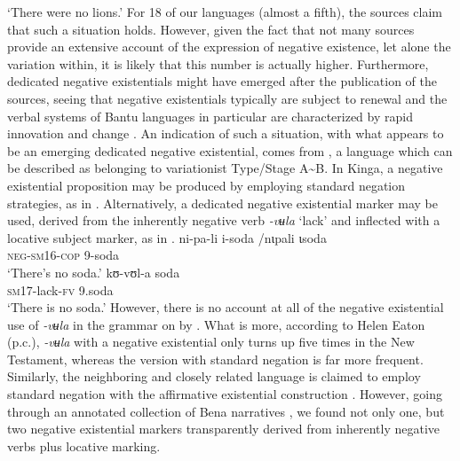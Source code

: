 \documentclass[output=paper]{langscibook}
\begin{document}
`There were no lions.' \z\z 
%
For 18
of our languages (almost a fifth), the sources claim that such a situation
holds. However, given the fact that not many sources provide an extensive
account of the expression of negative existence, let alone the variation
within, it is likely that this number is actually higher. Furthermore,
dedicated negative existentials might have emerged after the publication of
the sources, seeing that negative existentials typically are subject to
renewal \citep{Veselinova2016} and the verbal systems of Bantu languages in particular are
characterized by rapid innovation and change \citep[25]{Nurse2008}. An
indication of such a situation, with what appears to be an emerging
dedicated negative existential, comes from , a language which
can be described as belonging to variationist Type\slash Stage
A{\textasciitilde}B. In Kinga, a negative existential proposition may be
produced by employing standard negation strategies, as in
. Alternatively, a dedicated negative existential
marker may be used, derived from the inherently negative verb
\textit{-vʉla} `lack' and inflected with a locative subject marker, as in
.  
%
\ea\label{ex:kinga-soda}  \ea\label{ex:kinga-soda-1} 
\gll ni-pa-li i-soda \op{\textasciitilde}/nɩpali ɩsoda\cp\\ 
\textsc{neg-sm16-cop} \textsc{9-}soda\\
\glt 	`There's no soda.' \ex\label{ex:kinga-soda-2} \gll kʊ{}-vʊl-a
soda\\ \textsc{sm}17-lack-\textsc{fv} 9.soda\\ \glt 	`There is no soda.'
\z\z 
%
However, there is no account at all of the negative existential use of
\textit{-vʉla} in the grammar on  by \citet{Wolff1905}. What is
more, according to Helen Eaton (p.c.), \textit{-vʉla}
with a negative existential only turns up five times in the New Testament,
whereas the version with standard negation is far more frequent. Similarly,
the neighboring and closely related language  is claimed to
employ standard negation with the affirmative existential construction
\citep[378]{Morrison2011}. However, going through an annotated collection
of Bena narratives \citep{Eaton2015a}, we found not only one, but two
negative existential markers transparently derived from inherently negative
verbs plus locative marking.
\end{document}
